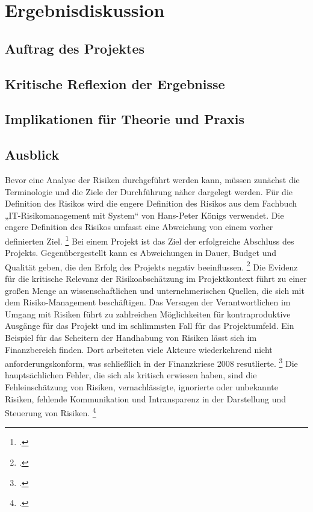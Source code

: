 \chapter{Ergebnisdiskussion}
\section{Auftrag des Projektes}
\section{Kritische Reflexion der Ergebnisse}
\section{Implikationen für Theorie und Praxis}
\section{Ausblick}
Bevor eine Analyse der Risiken durchgeführt werden kann, müssen zunächst die Terminologie und die Ziele der Durchführung näher dargelegt werden. 
Für die Definition des Risikos wird die engere Definition des Risikos aus dem Fachbuch „IT-Risikomanagement mit System“ von Hans-Peter Königs verwendet. 
Die engere Definition des Risikos umfasst eine Abweichung von einem vorher definierten Ziel.
\footcite[Vgl.][12]{koenigsITRisikomanagementMitSystem2017}
Bei einem Projekt ist das Ziel der erfolgreiche Abschluss des Projekts.
Gegenübergestellt kann es Abweichungen in Dauer, Budget und Qualität geben, die den Erfolg des Projekts negativ beeinflussen.
\footcite[Vgl.][13]{koenigsITRisikomanagementMitSystem2017}
Die Evidenz für die kritische Relevanz der Risikoabschätzung im Projektkontext führt zu einer großen
Menge an wissenschaftlichen und unternehmerischen Quellen, die sich mit dem Risiko-Management beschäftigen.
Das Versagen der Verantwortlichen im Umgang mit Risiken führt zu zahlreichen Möglichkeiten für kontraproduktive Ausgänge für das Projekt und im schlimmsten Fall für das Projektumfeld.
Ein Beispiel für das Scheitern der Handhabung von Risiken lässt sich im Finanzbereich finden.
Dort arbeiteten viele Akteure wiederkehrend nicht anforderungskonform, was schließlich in der Finanzkriese 2008 resutlierte.
\footcite[Vgl.][39]{stulzRiskManagementFailures2008}
Die hauptsächlichen Fehler, die sich als kritisch erwiesen haben, sind die Fehleinschätzung von Risiken,
vernachlässigte, ignorierte oder unbekannte Risiken, fehlende Kommunikation und Intransparenz in der Darstellung und Steuerung von Risiken.
\footcite[Vgl.][S. 42 ff.]{stulzRiskManagementFailures2008}

